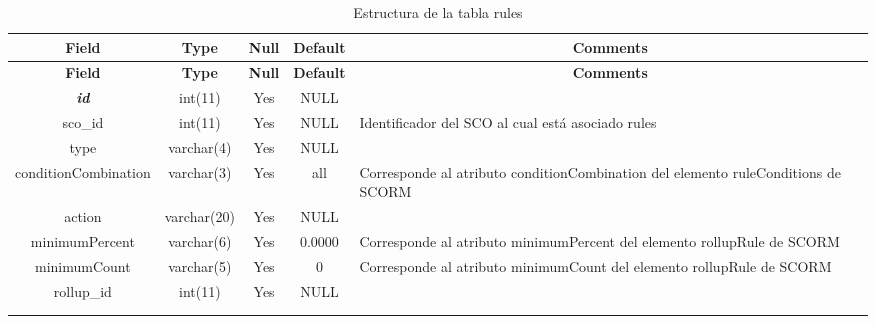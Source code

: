 %
%
\begin{longtable}{c c c c l}
	\multicolumn{1}{c}{\textbf{Field}} &
	\multicolumn{1}{c}{\textbf{Type}} &
	\multicolumn{1}{c}{\textbf{Null}} &
	\multicolumn{1}{c}{\textbf{Default}} &
	\multicolumn{1}{c}{\textbf{Comments}} \\ \hline \hline
\endfirsthead
	\multicolumn{1}{c}{\textbf{Field}} &
	\multicolumn{1}{c}{\textbf{Type}} &
	\multicolumn{1}{c}{\textbf{Null}} &
	\multicolumn{1}{c}{\textbf{Default}} &
	\multicolumn{1}{c}{\textbf{Comments}} \\ \hline \hline
\endhead \endfoot
	\textbf{\textit{id}} & int(11) & Yes & NULL \\ \hline 
	sco\_id & int(11) & Yes & NULL & \parbox[t]{0.35\textwidth}{Identificador del SCO al cual está asociado rules}\\ \hline 
	type & varchar(4) & Yes & NULL \\ \hline 
	conditionCombination & varchar(3) & Yes & all & \parbox[t]{0.35\textwidth}{Corresponde al atributo conditionCombination del elemento ruleConditions de SCORM}\\ \hline 
	action & varchar(20) & Yes & NULL \\ \hline 
	minimumPercent & varchar(6) & Yes & 0.0000 & \parbox[t]{0.35\textwidth}{Corresponde al atributo minimumPercent del elemento rollupRule de SCORM}\\ \hline 
	minimumCount & varchar(5) & Yes & 0 & \parbox[t]{0.35\textwidth}{Corresponde al atributo minimumCount del elemento rollupRule de SCORM} \\ \hline 
	rollup\_id & int(11) & Yes & NULL \\ \\ 
 \caption{Estructura de la tabla rules} \label{tab:scorm_rules-structure} \\
\end{longtable}


